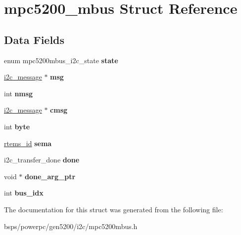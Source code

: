 \hypertarget{structmpc5200__mbus}{}\section{mpc5200\+\_\+mbus Struct Reference}
\label{structmpc5200__mbus}
\subsection*{Data Fields}
\begin{DoxyCompactItemize}
\item 
\mbox{\label{structmpc5200__mbus_ac4f4b9a68e23c47c3422d95d49b98816}} 
enum mpc5200mbus\+\_\+i2c\+\_\+state {\bfseries state}
\item 
\mbox{\label{structmpc5200__mbus_a1f7147c20fc7a6a263aaca51c18ad3fb}} 
\mbox{\hyperlink{structi2c__message}{i2c\+\_\+message}} $\ast$ {\bfseries msg}
\item 
\mbox{\label{structmpc5200__mbus_a5015de6e5a90a0344c59ae21c082130a}} 
int {\bfseries nmsg}
\item 
\mbox{\label{structmpc5200__mbus_ace8768d2c1ab873e02d5130575b26c70}} 
\mbox{\hyperlink{structi2c__message}{i2c\+\_\+message}} $\ast$ {\bfseries cmsg}
\item 
\mbox{\label{structmpc5200__mbus_ad3574c3a25ae72d901732ced7ab7c43e}} 
int {\bfseries byte}
\item 
\mbox{\label{structmpc5200__mbus_a54508924fc9ab0e8d326713d4bd10f25}} 
\mbox{\hyperlink{group__ClassicTasks_gab20892b814dced7dd4e5b9bf42becd57}{rtems\+\_\+id}} {\bfseries sema}
\item 
\mbox{\label{structmpc5200__mbus_a95fe8bf1058d11584a69e95cd448d8ab}} 
i2c\+\_\+transfer\+\_\+done {\bfseries done}
\item 
\mbox{\label{structmpc5200__mbus_a807184bbfb42a93d4ac2ec423a8d6ba9}} 
void $\ast$ {\bfseries done\+\_\+arg\+\_\+ptr}
\item 
\mbox{\label{structmpc5200__mbus_af29c269c770fed2495febe16e859d37b}} 
int {\bfseries bus\+\_\+idx}
\end{DoxyCompactItemize}


The documentation for this struct was generated from the following file\+:\begin{DoxyCompactItemize}
\item 
bsps/powerpc/gen5200/i2c/mpc5200mbus.\+h\end{DoxyCompactItemize}
